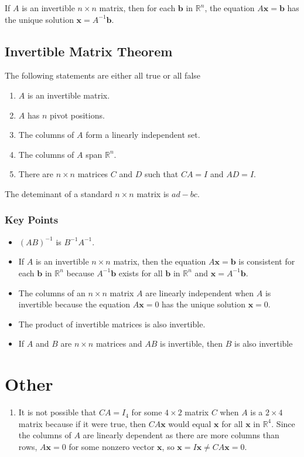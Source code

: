 \documentclass{article}
\begin{document}
If $A$ is an invertible $n\times n$ matrix, then for each $\mathbf{b}$ in $\mathbb{R}^n$, the equation $A\mathbf{x}=\mathbf{b}$ has the unique solution $\mathbf{x}=A^{-1}\mathbf{b}$.

\subsection*{Invertible Matrix Theorem}
The following statements are either all true or all false
\begin{enumerate}
    \item $A$ is an invertible matrix.
    \item $A$ has $n$ pivot positions.
    \item The columns of $A$ form a linearly independent set.
    \item The columns of $A$ span $\mathbb{R}^n$.
    \item There are $n\times n$ matrices $C$ and $D$ such that $CA=I$ and $AD=I$.
\end{enumerate}

The deteminant of a standard $n\times n$ matrix is $ad-bc$.

\subsubsection*{Key Points}
\begin{itemize}
    \item $(AB)^{-1}$ is $B^{-1}A^{-1}$.
    \item If $A$ is an invertible $n\times n$ matrix, then the equation $A\mathbf{x}=\mathbf{b}$ is consistent for each $\mathbf{b}$ in $\mathbb{R}^n$ because $A^{-1}\mathbf{b}$ exists for all $\mathbf{b}$ in $\mathbb{R}^n$ and $\mathbf{x}=A^{-1}\mathbf{b}$.
    \item The columns of an $n\times n$ matrix $A$ are linearly independent when $A$ is invertible because the equation $A\mathbf{x}=0$ has the unique solution $\mathbf{x}=0$.
    \item The product of invertible matrices is also invertible.
    \item If $A$ and $B$ are $n\times n$ matrices and $AB$ is invertible, then $B$ is also invertible
\end{itemize}

\section*{Other}
\begin{enumerate}
    \item It is not possible that $CA=I_4$ for some $4\times 2$ matrix $C$ when $A$ is a $2\times 4$ matrix because if it were true, then $CA\mathbf{x}$ would equal $\mathbf{x}$ for all $\mathbf{x}$ in $\mathbb{R}^4$. Since the columns of $A$ are linearly dependent as there are more columns than rows, $A\mathbf{x}=0$ for some nonzero vector $\mathbf{x}$, so $\mathbf{x}=I\mathbf{x}\neq CA\mathbf{x}=0$.
\end{enumerate}
\end{document}
